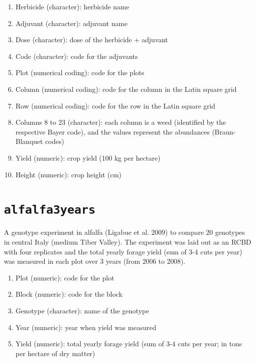 \documentclass[
  letterpaper,
  DIV=11,
  numbers=noendperiod]{scrreprt}
\providecommand{\tightlist}{%
  \setlength{\itemsep}{0pt}\setlength{\parskip}{0pt}}
\begin{document}
\begin{enumerate}
\def\labelenumi{\arabic{enumi}.}
\tightlist
\item
  Herbicide (character): herbicide name
\item
  Adjuvant (character): adjuvant name
\item
  Dose (character): dose of the herbicide + adjuvant
\item
  Code (character): code for the adjuvants
\item
  Plot (numerical coding): code for the plots
\item
  Column (numerical coding): code for the column in the Latin square
  grid
\item
  Row (numerical coding): code for the row in the Latin square grid
\item
  Columns 8 to 23 (character): each column is a weed (identified by the
  respective Bayer code), and the values represent the abundances
  (Braun-Blanquet codes)
\item
  Yield (numeric): crop yield (100 kg per hectare)
\item
  Height (numeric): crop height (cm)
\end{enumerate}

\section*{\texorpdfstring{\texttt{alfalfa3years}}{alfalfa3years}}\label{alfalfa3years}


A genotype experiment in alfalfa (Ligabue et al. 2009) to compare 20
genotypes in central Italy (medium Tiber Valley). The experiment was
laid out as an RCBD with four replicates and the total yearly forage
yield (sum of 3-4 cuts per year) was measured in each plot over 3 years
(from 2006 to 2008).

\begin{enumerate}
\def\labelenumi{\arabic{enumi}.}
\tightlist
\item
  Plot (numeric): code for the plot
\item
  Block (numeric): code for the block
\item
  Genotype (character): name of the genotype
\item
  Year (numeric): year when yield was measured
\item
  Yield (numeric): total yearly forage yield (sum of 3-4 cuts per year;
  in tons per hectare of dry matter)
\end{enumerate}
\end{document}
